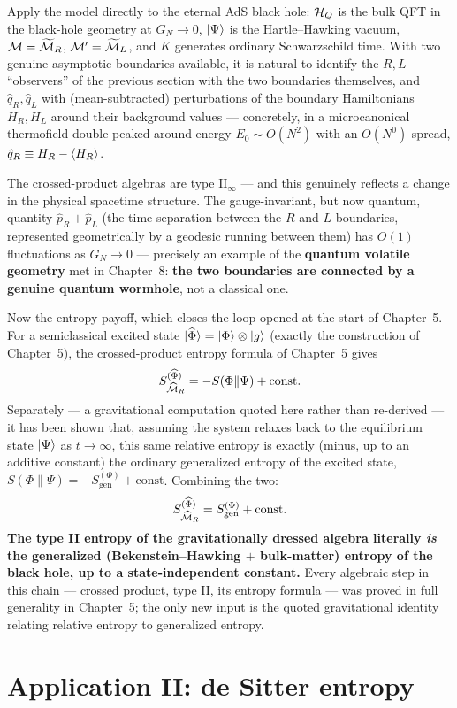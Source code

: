 Apply the model directly to the eternal AdS black hole: $\mathcal{H}_Q$ is the bulk QFT in the black-hole geometry at
$G_N\to0$, $\ket\Psi$ is the Hartle--Hawking vacuum, $\mathcal{M}=\widetilde{\mathcal{M}}_R$, $\mathcal{M}'=\widetilde{\mathcal{M}}_L$, and $K$
generates ordinary Schwarzschild time. With two genuine asymptotic boundaries available, it is natural to
identify the $R,L$ ``observers'' of the previous section with the two boundaries themselves, and
$\hat q_R,\hat q_L$ with (mean-subtracted) perturbations of the boundary Hamiltonians $H_R,H_L$ around their
background values — concretely, in a microcanonical thermofield double peaked around energy $E_0\sim O(N^2)$
with an $O(N^0)$ spread, $\hat q_R\equiv H_R-\braket{H_R}$.

The crossed-product algebras are type $\mathrm{II}_\infty$ — and this genuinely reflects a change in the
physical spacetime structure. The gauge-invariant, but now quantum, quantity $\hat p_R+\hat p_L$ (the time
separation between the $R$ and $L$ boundaries, represented geometrically by a geodesic running between them)
has $O(1)$ fluctuations as $G_N\to0$ — precisely an example of the \textbf{quantum volatile geometry} met in
Chapter~8: \textbf{the two boundaries are connected by a genuine quantum wormhole}, not a classical one.

Now the entropy payoff, which closes the loop opened at the start of Chapter~5. For a semiclassical excited
state $\ket{\widehat\Phi}=\ket\Phi\otimes\ket g$ (exactly the construction of Chapter~5), the crossed-product
entropy formula of Chapter~5 gives
\[
S_{\widehat{\mathcal{M}}_R}^{(\widehat\Phi)} = -S(\Phi\|\Psi) + \text{const} .
\]
Separately — a gravitational computation quoted here rather than re-derived — it has been shown that,
assuming the system relaxes back to the equilibrium state $\ket\Psi$ as $t\to\infty$, this same relative
entropy is exactly (minus, up to an additive constant) the ordinary generalized entropy of the excited state,
$S(\Phi\|\Psi)=-S_{\text{gen}}^{(\Phi)}+\text{const}$. Combining the two:
\[
S_{\widehat{\mathcal{M}}_R}^{(\widehat\Phi)} = S_{\text{gen}}^{(\Phi)} + \text{const} .
\]
\textbf{The type II entropy of the gravitationally dressed algebra literally \emph{is} the generalized
(Bekenstein--Hawking $+$ bulk-matter) entropy of the black hole, up to a state-independent constant.} Every
algebraic step in this chain — crossed product, type II, its entropy formula — was proved in full generality in
Chapter~5; the only new input is the quoted gravitational identity relating relative entropy to generalized
entropy.

\section{Application II: de Sitter entropy}

